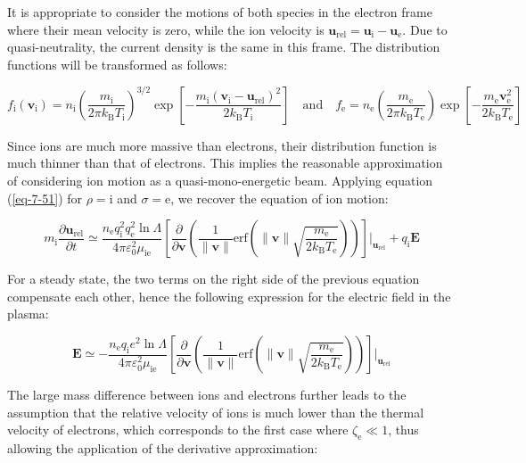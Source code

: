 It is appropriate to consider the motions of both species in the electron frame where their mean velocity is zero, while the ion velocity is $\mathbf{u}_\text{rel}=\mathbf{u}_\mathrm{i}-\mathbf{u}_\text{e}$. Due to quasi-neutrality, the current density is the same in this frame. The distribution functions will be transformed as follows:

\begin{equation}
    f_\mathrm{i}(\mathbf{v}_\mathrm{i})=n_\mathrm{i}\left(\frac{m_\mathrm{i}}{2\pi k_\mathrm{B}T_\mathrm{i}}\right)^{3/2}\exp{\left[-\frac{m_\mathrm{i}\left(\mathbf{v}_\mathrm{i}-\mathbf{u}_\text{rel}\right)^2}{2k_\mathrm{B}T_\mathrm{i}}\right]}\quad\text{and}\quad f_\text{e}=n_\text{e}\left(\frac{m_\text{e}}{2 \pi k_\mathrm{B}T_\text{e}}\right)\exp{\left[-\frac{m_\text{e}\mathbf{v}_\text{e}^2}{2k_\mathrm{B}T_\text{e}}\right]}
\end{equation}

Since ions are much more massive than electrons, their distribution function is much thinner than that of electrons. This implies the reasonable approximation of considering ion motion as a quasi-mono-energetic beam. Applying equation (\ref{eq-7-51}) for $\rho=\mathrm{i}$ and $\sigma=\text{e}$, we recover the equation of ion motion:

\begin{equation}
    \label{eq-7-63}
    m_\mathrm{i}\frac{\partial\mathbf{u}_\text{rel}}{\partial t}\simeq\frac{n_\text{e}q_\mathrm{i}^2q_\text{e}^2\ln{\Lambda}}{4\pi\varepsilon_0^2\mu_{\text{ie}}}\left[\frac{\partial}{\partial\mathbf{v}}\left(\frac{1}{\|\mathbf{v}\|}\mathrm{erf}\left(\|\mathbf{v}\|\sqrt{\frac{m_\text{e}}{2k_\mathrm{B}T_\text{e}}}\right)\right)\right]\Biggr|_{\mathbf{u}_\text{rel}}+q_\mathrm{i}\mathbf{E}
\end{equation}

For a steady state, the two terms on the right side of the previous equation compensate each other, hence the following expression for the electric field in the plasma:

\begin{equation}
    \mathbf{E}\simeq-\frac{n_\text{e}q_\mathrm{i}e^2\ln{\Lambda}}{4\pi\varepsilon_0^2\mu_\text{ie}}\left[\frac{\partial}{\partial\mathbf{v}}\left(\frac{1}{\|\mathbf{v}\|}\mathrm{erf}\left(\|\mathbf{v}\|\sqrt{\frac{m_\text{e}}{2k_\mathrm{B}T_\text{e}}}\right)\right)\right]\Biggr|_{\mathbf{u}_\text{rel}}
\end{equation}

The large mass difference between ions and electrons further leads to the assumption that the relative velocity of ions is much lower than the thermal velocity of electrons, which corresponds to the first case where $\zeta_\text{e}\ll1$, thus allowing the application of the derivative approximation:

